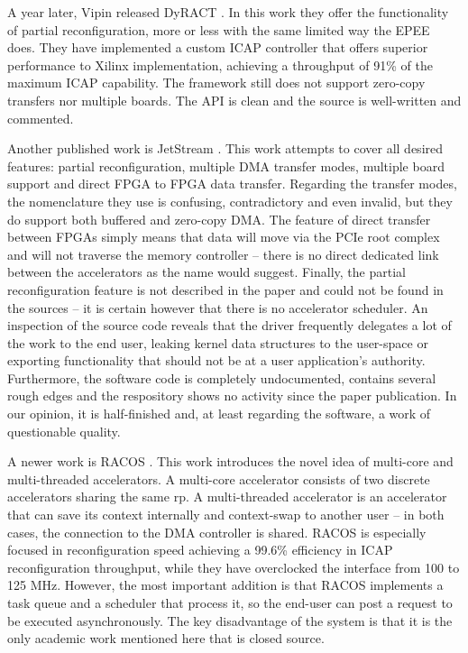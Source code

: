 A year later, Vipin released DyRACT \cite{dyract}.
In this work they offer the functionality of partial reconfiguration, more or less with the same limited way the EPEE does.
They have implemented a custom ICAP controller that offers superior performance to Xilinx implementation,
achieving a throughput of 91\% of the maximum ICAP capability.
The framework still does not support zero-copy transfers nor multiple boards. The API is clean and the source is well-written and commented.

Another published work is JetStream \cite{jetstream}. This work attempts to cover all desired features:
partial reconfiguration, multiple DMA transfer modes, multiple board support and direct FPGA to FPGA data transfer.
Regarding the transfer modes, the nomenclature they use is confusing, contradictory and even invalid,
but they do support both buffered and zero-copy DMA.
The feature of direct transfer between FPGAs simply means that data will move via the PCIe root complex 
and will not traverse the memory controller -- there is no
direct dedicated link between the accelerators as the name would suggest. 
Finally, the partial reconfiguration feature is not described in the paper and 
could not be found in the sources -- it is certain however that there is no accelerator scheduler.
An inspection of the source code reveals that the driver frequently delegates a lot of the work to the end user,
leaking kernel data structures to the user-space 
or exporting functionality that should not be at a user application's authority.
Furthermore, the software code is completely undocumented, 
contains several rough edges and the respository shows no activity since the paper publication.
In our opinion, it is half-finished and, at least regarding the software, a work of questionable quality.

A newer work is RACOS \cite{racos}. This work introduces the novel idea of multi-core and multi-threaded accelerators.
A multi-core accelerator consists of two discrete accelerators sharing the same \gls{rp}. 
A multi-threaded accelerator is an accelerator that can save its context internally and 
context-swap to another user -- in both cases, the connection to the DMA controller is shared. 
RACOS is especially focused in reconfiguration speed achieving a 99.6\%
efficiency in ICAP reconfiguration throughput, while they have overclocked the interface from 100 to 125 MHz.
However, the most important addition is that RACOS implements a task queue and a scheduler that process it,
so the end-user can post a request to be executed asynchronously. 
The key disadvantage of the system is that it is the only academic work mentioned here that is closed source.


